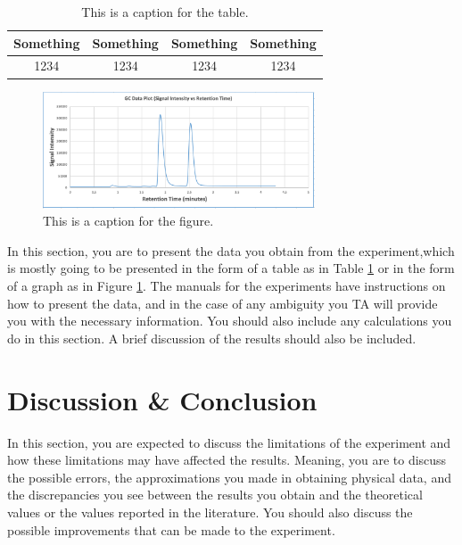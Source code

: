 \documentclass[10pt]{article}
\begin{document}
\begin{table}[ht]
    \centering
    \begin{tabular}{|c|c|c|c|}
        \hline
        Something & Something & Something & Something \\
        \hline
        1234 & 1234 & 1234 & 1234 \\
        \hline
    \end{tabular}
    \caption{This is a caption for the table.}
    \label{tab:ex}
\end{table}

\begin{figure}[ht]
    \centering
    \includegraphics[width=0.72\textwidth]{example_figure.png}
    \caption{This is a caption for the figure.}
    \label{fig:ex}
\end{figure}

In this section, you are to present the data you obtain from the experiment,which is mostly going to be presented in the form of a table as in Table \ref{tab:ex} or in the form of a graph as in Figure \ref{fig:ex}. The manuals for the experiments have instructions on how to present the data, and in the case of any ambiguity you TA will provide you with the necessary information. You should also include any calculations you do in this section. A brief discussion of the results should also be included.

\section{Discussion \& Conclusion}

In this section, you are expected to discuss the limitations of the experiment and how these limitations may have affected the results. Meaning, you are to discuss the possible errors, the approximations you made in obtaining physical data, and the discrepancies you see between the results you obtain and the theoretical values or the values reported in the literature. You should also discuss the possible improvements that can be made to the experiment. 

\printbibliography

\end{document}
